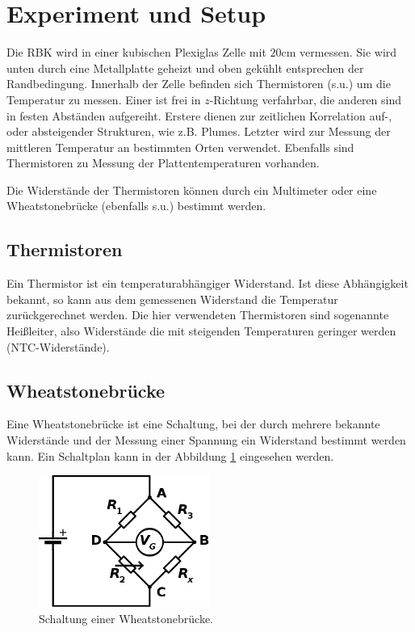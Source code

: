 \documentclass[12pt,a4paper,titlepage,headinclude]{scrartcl}
\numberwithin{equation}{subsection}
\begin{document}
\newpage
\section{Experiment und Setup}
\label{sec:durchfuehrung}

Die RBK wird in einer kubischen Plexiglas Zelle mit $20\si{\centi\meter}$ vermessen.
Sie wird unten durch eine Metallplatte geheizt und oben gekühlt entsprechen der Randbedingung.
Innerhalb der Zelle befinden sich Thermistoren (s.u.) um die Temperatur zu messen.
Einer ist frei in $z$-Richtung verfahrbar, die anderen sind in festen Abständen aufgereiht.
Erstere dienen zur zeitlichen Korrelation auf-, oder absteigender Strukturen, wie z.B. Plumes.
Letzter wird zur Messung der mittleren Temperatur an bestimmten Orten verwendet.
Ebenfalls sind Thermistoren zu Messung der Plattentemperaturen vorhanden.

Die Widerstände der Thermistoren können durch ein Multimeter oder eine Wheatstonebrücke (ebenfalls s.u.) bestimmt werden.

\subsection{Thermistoren}
Ein Thermistor ist ein temperaturabhängiger Widerstand.
Ist diese Abhängigkeit bekannt, so kann aus dem gemessenen Widerstand die Temperatur zurückgerechnet werden.
Die hier verwendeten Thermistoren sind sogenannte Heißleiter, also Widerstände die mit steigenden Temperaturen geringer werden (NTC-Widerstände).

\subsection{Wheatstonebrücke}
Eine Wheatstonebrücke ist eine Schaltung, bei der durch mehrere bekannte Widerstände und der Messung einer Spannung ein Widerstand bestimmt werden kann.
Ein Schaltplan kann in der Abbildung \ref{fig:wheat} eingesehen werden.
\begin{figure}[!ht]
\centering
\includegraphics[width=0.5\textwidth]{Wheatstone}
\caption{Schaltung einer Wheatstonebrücke.\protect\footnotemark}
\label{fig:wheat}
\end{figure}
\end{document}
